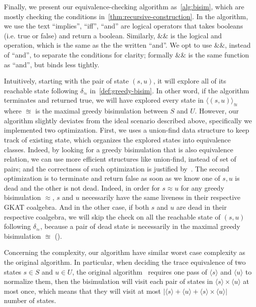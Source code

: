 \documentclass[conference]{IEEEtran}
\begin{document}
Finally, we present our equivalence-checking algorithm as~\cref{alg:bisim}, which are mostly checking the conditions in~\cref{thm:recursive-construction}.  
In the algorithm, we use the text ``implies'', ``iff'', ``and'' are logical operators that takes booleans (i.e. true or false) and return a boolean.
Similarly, \(\&\!\&\) is the logical and operation, which is the same as the the written ``and''. 
We opt to use \(\&\!\&\), instead of ``and'', to separate the conditions for clarity; formally \(\&\!\&\) is the same function as ``and'', but binds less tightly.

Intuitively, starting with the pair of state \((s, u)\), it will explore all of its reachable state following \(δ_≈\) in~\cref{def:greedy-bisim}.
In other word, if the algorithm terminates and returned true, we will have explored every state in \(⟨(s, u)⟩_{≊}\) where \(≊\) is the maximal greedy bisimulation between \(S\) and \(U\).
However, our algorithm slightly deviates from the ideal scenario described above, specifically we implemented two optimization.
First, we uses a union-find data structure to keep track of existing state, which organizes the explored states into equivalence classes.
Indeed, by looking for a greedy bisimulation that is also equivalence relation, we can use more efficient structures like union-find, instead of set of pairs; and the correctness of such optimization is justified by~.
The second optimization is to terminate and return false as soon as we know one of \(s, u\) is dead and the other is not dead.
Indeed, in order for \(s ≈ u\) for any greedy bisimulation \(≈\), \(s\) and \(u\) necessarily have the same liveness in their respective GKAT coalgebra.
And in the other case, if both \(s\) and \(u\) are dead in their respective coalgebra, we will skip the check on all the reachable state of \((s, u)\) following \(δ_≈\), because a pair of dead state is necessarily in the maximal greedy bisimulation \(≊\) ().

Concerning the complexity, our algorithm have similar worst case complexity as the original algorithm.
In particular, when deciding the trace equivalence of two states \(s ∈ S\) and \(u ∈ U\), the original algorithm~\cite{smolka_GuardedKleeneAlgebra_2020} requires one pass of \(⟨s⟩\) and \(⟨u⟩\) to normalize them, then the bisimulation will visit each pair of states in \(⟨s⟩ × ⟨u⟩\) at most once, which means that they will visit at most \(|⟨s⟩ + ⟨u⟩ + ⟨s⟩ × ⟨u⟩|\) number of states.
\end{document}
